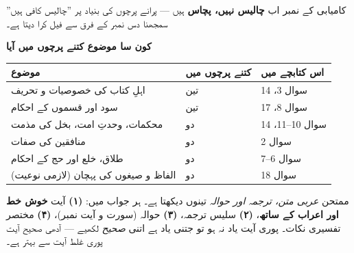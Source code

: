 \medskip
\begin{ghalti}
کامیابی کے نمبر اب \textbf{چالیس نہیں، پچاس} ہیں --- پرانے پرچوں کی بنیاد پر
''چالیس کافی ہیں'' سمجھنا دس نمبر کے فرق سے فیل کرا دیتا ہے۔
\end{ghalti}

\medskip
\noindent
\textbf{\color{bmblue}کون سا موضوع کتنے پرچوں میں آیا}

\smallskip
\begin{center}
\begin{tabular}{@{}p{7.0cm} p{2.2cm} p{4.8cm}@{}}
\toprule
\textbf{موضوع} & \textbf{کتنے پرچوں میں} & \textbf{اس کتابچے میں} \\
\midrule
اہلِ کتاب کی خصوصیات و تحریف       & تین  & سوال \textenglish{3}، \textenglish{14} \\
سود اور قسموں کے احکام             & تین  & سوال \textenglish{8}، \textenglish{17} \\
محکمات، وحدتِ امت، بخل کی مذمت      & دو   & سوال \textenglish{10--11}، \textenglish{14} \\
منافقین کی صفات                     & دو   & سوال \textenglish{2} \\
طلاق، خلع اور حج کے احکام           & دو   & سوال \textenglish{6--7} \\
الفاظ و صیغوں کی پہچان (لازمی نوعیت) & دو   & سوال \textenglish{18} \\
\bottomrule
\end{tabular}
\end{center}

\medskip
\begin{nukta}
ممتحن \emph{عربی متن، ترجمہ اور حوالہ} تینوں دیکھتا ہے۔ ہر جواب میں:
\textbf{(۱)} آیت \textbf{خوش خط اور اعراب کے ساتھ}، \textbf{(۲)} سلیس
ترجمہ، \textbf{(۳)} حوالہ (سورت و آیت نمبر)، \textbf{(۴)} مختصر تفسیری نکات۔
پوری آیت یاد نہ ہو تو جتنی یاد ہے اتنی \emph{صحیح} لکھیے --- آدھی صحیح آیت
پوری غلط آیت سے بہتر ہے۔
\end{nukta}
